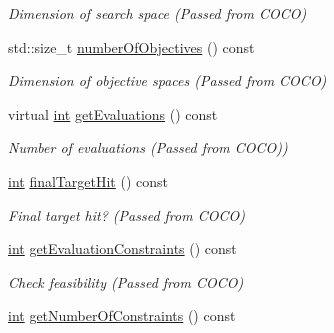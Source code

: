 \begin{DoxyCompactItemize}
\begin{DoxyCompactList}\small\item\em Dimension of search space (Passed from C\+O\+CO) \end{DoxyCompactList}\item 
std\+::size\+\_\+t \hyperlink{classCOCOfunc_a0d46ada22e366ec1b13a69049d44677b}{number\+Of\+Objectives} () const \hypertarget{classCOCOfunc_a0d46ada22e366ec1b13a69049d44677b}{}\label{classCOCOfunc_a0d46ada22e366ec1b13a69049d44677b}

\begin{DoxyCompactList}\small\item\em Dimension of objective spaces (Passed from C\+O\+CO) \end{DoxyCompactList}\item 
virtual \hyperlink{classint}{int} \hyperlink{classCOCOfunc_ac8770bd1d86e5c945b68a79998725d3b}{get\+Evaluations} () const \hypertarget{classCOCOfunc_ac8770bd1d86e5c945b68a79998725d3b}{}\label{classCOCOfunc_ac8770bd1d86e5c945b68a79998725d3b}

\begin{DoxyCompactList}\small\item\em Number of evaluations (Passed from C\+O\+CO)) \end{DoxyCompactList}\item 
\hyperlink{classint}{int} \hyperlink{classCOCOfunc_a0cd816c1e89961720d2aa66e69b19634}{final\+Target\+Hit} () const \hypertarget{classCOCOfunc_a0cd816c1e89961720d2aa66e69b19634}{}\label{classCOCOfunc_a0cd816c1e89961720d2aa66e69b19634}

\begin{DoxyCompactList}\small\item\em Final target hit? (Passed from C\+O\+CO) \end{DoxyCompactList}\item 
\hyperlink{classint}{int} \hyperlink{classCOCOfunc_a9b419be16b230e408030c5e57218a52d}{get\+Evaluation\+Constraints} () const \hypertarget{classCOCOfunc_a9b419be16b230e408030c5e57218a52d}{}\label{classCOCOfunc_a9b419be16b230e408030c5e57218a52d}

\begin{DoxyCompactList}\small\item\em Check feasibility (Passed from C\+O\+CO) \end{DoxyCompactList}\item 
\hyperlink{classint}{int} \hyperlink{classCOCOfunc_ab7a3f2bc6dcf4cc749af04043e74badc}{get\+Number\+Of\+Constraints} () const \hypertarget{classCOCOfunc_ab7a3f2bc6dcf4cc749af04043e74badc}{}\label{classCOCOfunc_ab7a3f2bc6dcf4cc749af04043e74badc}


\end{DoxyCompactItemize}
